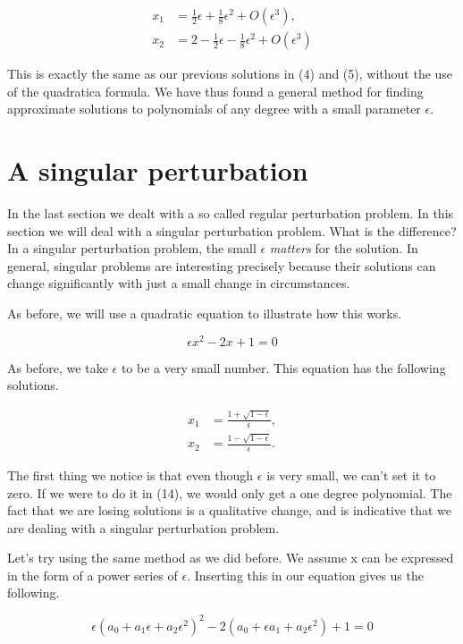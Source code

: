 \documentclass[12pt]{article}
\begin{document}
\begin{align}
x_1 &= \frac{1}{2} \epsilon + \frac{1}{8} \epsilon^2 + O(\epsilon^3), \\
x_2 &= 2 - \frac{1}{2} \epsilon - \frac{1}{8} \epsilon^2 + O(\epsilon^3)
\end{align}

This is exactly the same as our previous solutions in (4) and (5),
without the use of the quadratica formula. We have thus found a
general method for finding approximate solutions to polynomials of any
degree with a small parameter $\epsilon$.

\section{A singular perturbation}

In the last section we dealt with a so called regular perturbation problem. In this section
we will deal with a singular perturbation problem. What is the difference? In a
singular perturbation problem, the small $\epsilon$ \textit{matters} for the
solution. In general, singular problems are interesting precisely
because their solutions can change significantly with just a small change in
circumstances.

As before, we will use a quadratic equation to illustrate how this works.

\begin{equation}
\epsilon x^2 - 2 x + 1 = 0
\end{equation}

As before, we take $\epsilon$ to be a very small number. This equation has the
following solutions.

\begin{align}
x_1 &= \frac{1 + \sqrt{1 - \epsilon}}{\epsilon}, \\
x_2 &= \frac{1 - \sqrt{1 - \epsilon}}{\epsilon}.
\end{align}

The first thing we notice is that even though $\epsilon$ is very small, we can't
set it to zero. If we were to do it in (14), we would only get a one degree
polynomial. The fact that we are losing solutions is a qualitative change, and
is indicative that we are dealing with a singular perturbation problem.

Let's try using the same method as we did before. We assume x can be
expressed in the form of a power series of $\epsilon$. Inserting this
in our equation gives us the following.

\begin{equation}
\epsilon (a_0 + a_1 \epsilon + a_2 \epsilon^2)^2 - 2(a_0 + \epsilon a_1 +
a_2 \epsilon^2) + 1 = 0
\end{equation}
\end{document}
